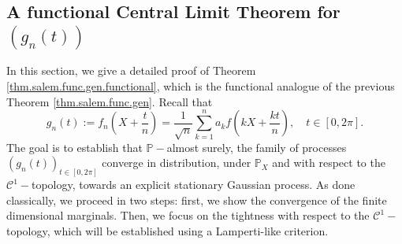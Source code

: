 \documentclass{svproc}
\newcommand{\Prob}{\mathbb{P}}
\begin{document}
\subsection{A functional Central Limit Theorem for $(g_n(t))$}\label{sec.func.SZ}
In this section, we give a detailed proof of Theorem \ref{thm.salem.func.gen.functional}, which is the functional analogue of the previous Theorem \ref{thm.salem.func.gen}. Recall that
\[
g_n(t):=f_n\left(X+\frac{t}{n}\right)=\frac{1}{\sqrt{n}}\sum_{k=1}^{n}a_kf\left(kX+\frac{kt}{n}\right), \quad t \in [0, 2\pi].
\]
The goal is to establish that $\Prob-$almost surely, the family of processes $(g_n(t))_{t\in [0,2\pi]}$ converge in distribution, under $\Prob_X$ and with respect to the $\mathcal C^1-$topology, towards an explicit stationary Gaussian process. As done classically, we proceed in two steps: first, we show the convergence of the finite dimensional marginals. Then, we focus on the tightness with respect to the $\mathcal C^1-$topology, which will be established using a Lamperti-like criterion.
\end{document}
